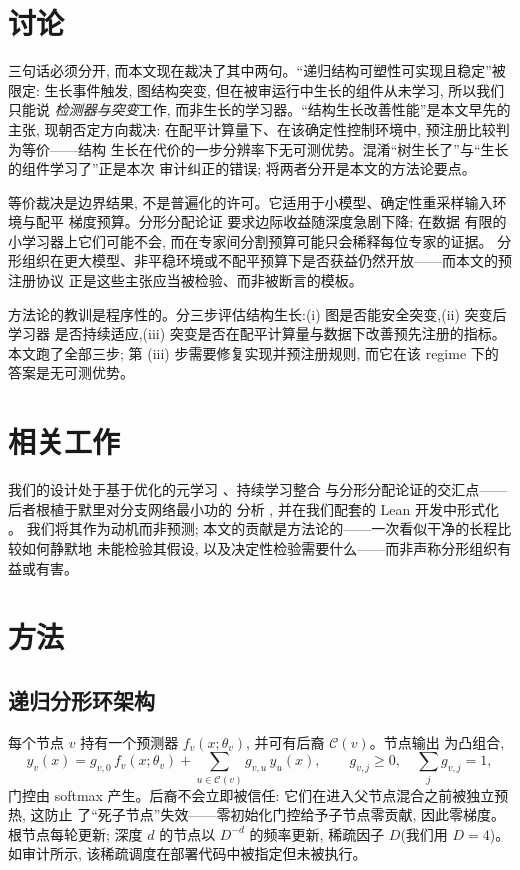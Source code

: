 \documentclass[11pt]{article}
\begin{document}
\section{讨论}

三句话必须分开, 而本文现在裁决了其中两句。``递归结构可塑性可实现且稳定''被限定:
生长事件触发, 图结构突变, 但在被审运行中生长的组件从未学习, 所以我们只能说
\emph{检测器与突变}工作, 而非生长的学习器。``结构生长改善性能''是本文早先的主张,
现朝否定方向裁决: 在配平计算量下、在该确定性控制环境中, 预注册比较判为等价——结构
生长在代价的一步分辨率下无可测优势。混淆``树生长了''与``生长的组件学习了''正是本次
审计纠正的错误; 将两者分开是本文的方法论要点。

等价裁决是边界结果, 不是普遍化的许可。它适用于小模型、确定性重采样输入环境与配平
梯度预算。分形分配论证 \cite{LmPrincipleFractal} 要求边际收益随深度急剧下降; 在数据
有限的小学习器上它们可能不会, 而在专家间分割预算可能只会稀释每位专家的证据。
分形组织在更大模型、非平稳环境或不配平预算下是否获益仍然开放——而本文的预注册协议
正是这些主张应当被检验、而非被断言的模板。

方法论的教训是程序性的。分三步评估结构生长:(i) 图是否能安全突变,(ii) 突变后学习器
是否持续适应,(iii) 突变是否在配平计算量与数据下改善预先注册的指标。本文跑了全部三步;
第 (iii) 步需要修复实现并预注册规则, 而它在该 regime 下的答案是无可测优势。

\section{相关工作}\label{sec:related}

我们的设计处于基于优化的元学习 \cite{Finn2017,Li2017}、持续学习整合
\cite{Kirkpatrick2017} 与分形分配论证的交汇点——后者根植于默里对分支网络最小功的
分析 \cite{Murray1926}, 并在我们配套的 Lean 开发中形式化 \cite{LmPrincipleFractal}。
我们将其作为动机而非预测; 本文的贡献是方法论的——一次看似干净的长程比较如何静默地
未能检验其假设, 以及决定性检验需要什么——而非声称分形组织有益或有害。

\section{方法}

\subsection{递归分形环架构}

每个节点 $v$ 持有一个预测器 $f_v(x;\theta_v)$, 并可有后裔 $\mathcal{C}(v)$。节点输出
为凸组合,
\begin{equation}
 y_v(x) = g_{v,0}\,f_v(x;\theta_v) + \sum_{u\in\mathcal{C}(v)} g_{v,u}\,y_u(x),
 \qquad g_{v,j}\ge 0,\quad \sum_j g_{v,j}=1,
\end{equation}
门控由 softmax 产生。后裔不会立即被信任: 它们在进入父节点混合之前被独立预热, 这防止
了``死子节点''失效——零初始化门控给予子节点零贡献, 因此零梯度。根节点每轮更新;
深度 $d$ 的节点以 $D^{-d}$ 的频率更新, 稀疏因子 $D$(我们用 $D=4$)。如审计所示,
该稀疏调度在部署代码中被指定但未被执行。
\end{document}
